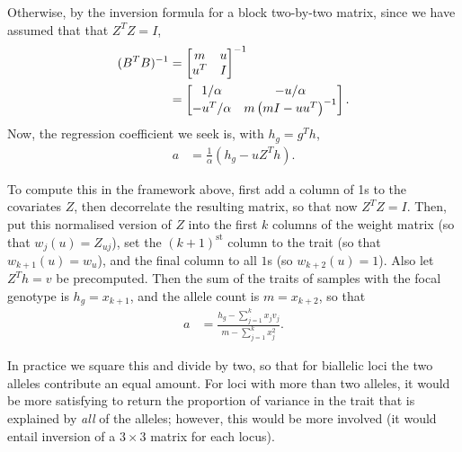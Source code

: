 \documentclass{article}
\begin{document}
Otherwise, by the inversion formula for a block two-by-two matrix,
since we have assumed that that $Z^T Z = I$,
\begin{align*}
    (B^T B)^{-1}
    &=
    \left[
        \begin{array}{@{}cc@{}}
            m & u \\
            u^T & I
        \end{array}
    \right]^{-1} \\
    &=
    \left[
        \begin{array}{@{}cc@{}}
            1/\alpha
            &
            - u / \alpha
            \\
            - u^T / \alpha
            &
            m \left(m I - u u^T \right)^{-1}
        \end{array}
    \right] .
\end{align*}
Now, the regression coefficient we seek is,
with $h_g = g^T h$,
\begin{align*}
    a
    &=
    \frac{1}{\alpha} \left(
        h_g - u Z^T h
    \right) .
\end{align*}

To compute this in the framework above,
first add a column of 1s to the covariates $Z$,
then decorrelate the resulting matrix, so that now $Z^T Z = I$.
Then, put this normalised version of $Z$ 
into the first $k$ columns of the weight matrix (so that $w_j(u) = Z_{uj}$),
set the $(k+1)^\text{st}$ column to the trait (so that $w_{k+1}(u) = w_u$),
and the final column to all $1$s (so $w_{k+2}(u) = 1$).
Also let $Z^T h = v$ be precomputed.
Then the sum of the traits of samples with the focal genotype is $h_g = x_{k+1}$,
and the allele count is $m = x_{k+2}$,
so that
\begin{align*}
    a
    &=
    \frac{
        h_g - \sum_{j=1}^k x_j v_j
    }{
        m - \sum_{j=1}^k x_j^2 } .
\end{align*}

In practice we square this and divide by two,
so that for biallelic loci the two alleles contribute an equal amount.
For loci with more than two alleles,
it would be more satisfying to return the proportion of variance in the trait
that is explained by \emph{all} of the alleles;
however, this would be more involved
(it would entail inversion of a $3 \times 3$ matrix for each locus).
\end{document}
